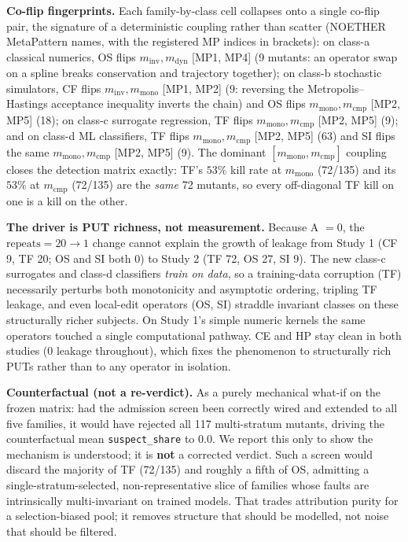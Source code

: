 \documentclass[manuscript,screen,review]{acmart}
\begin{document}
\textbf{Co-flip fingerprints.} Each family-by-class cell collapses onto a
single co-flip pair, the signature of a deterministic coupling rather than
scatter (NOETHER MetaPattern names, with the registered MP indices in
brackets): on class-a classical numerics, OS flips
\(m_{\mathrm{inv}},m_{\mathrm{dyn}}\) [MP1, MP4] (9 mutants: an operator swap
on a spline breaks conservation and trajectory together); on class-b
stochastic simulators, CF flips \(m_{\mathrm{inv}},m_{\mathrm{mono}}\)
[MP1, MP2] (9: reversing the Metropolis--Hastings acceptance inequality
inverts the chain) and OS flips \(m_{\mathrm{mono}},m_{\mathrm{cmp}}\)
[MP2, MP5] (18); on class-c surrogate regression, TF flips
\(m_{\mathrm{mono}},m_{\mathrm{cmp}}\) [MP2, MP5] (9); and on class-d ML
classifiers, TF flips \(m_{\mathrm{mono}},m_{\mathrm{cmp}}\) [MP2, MP5] (63)
and SI flips the same \(m_{\mathrm{mono}},m_{\mathrm{cmp}}\) [MP2, MP5] (9).
The dominant \([m_{\mathrm{mono}},m_{\mathrm{cmp}}]\) coupling closes the
detection matrix exactly: TF's \(53\%\) kill rate at \(m_{\mathrm{mono}}\)
(72/135) and its \(53\%\) at \(m_{\mathrm{cmp}}\) (72/135) are the \emph{same}
72 mutants, so every off-diagonal TF kill on one is a kill on the other.

\textbf{The driver is PUT richness, not measurement.} Because A \(=0\), the
\(\mathrm{repeats}=20\to1\) change cannot explain the growth of leakage from
Study 1 (CF 9, TF 20; OS and SI both 0) to Study 2 (TF 72, OS 27, SI 9). The
new class-c surrogates and class-d classifiers \emph{train on data}, so a
training-data corruption (TF) necessarily perturbs both monotonicity and
asymptotic ordering, tripling TF leakage, and even local-edit operators
(OS, SI) straddle invariant classes on these structurally richer subjects. On
Study 1's simple numeric kernels the same operators touched a single
computational pathway. CE and HP stay clean in both studies (0 leakage
throughout), which fixes the phenomenon to structurally rich PUTs rather than
to any operator in isolation.

\textbf{Counterfactual (not a re-verdict).} As a purely mechanical what-if on
the frozen matrix: had the admission screen been correctly wired and extended
to all five families, it would have rejected all 117 multi-stratum mutants,
driving the counterfactual mean \texttt{suspect\_share} to \(0.0\). We report
this only to show the mechanism is understood; it is \textbf{not} a corrected
verdict. Such a screen would discard the majority of TF (72/135) and roughly a
fifth of OS, admitting a single-stratum-selected, non-representative slice of
families whose faults are intrinsically multi-invariant on trained models.
That trades attribution purity for a selection-biased pool; it removes
structure that should be modelled, not noise that should be filtered.
\end{document}
